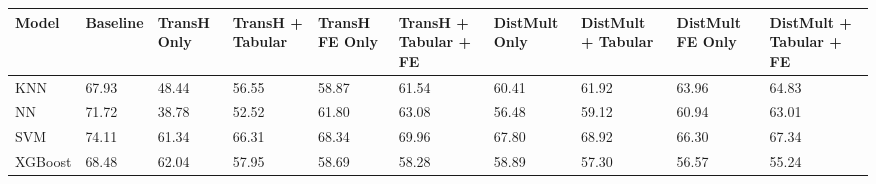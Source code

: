 \begin{tabular}{llllllllll}
\toprule
Model & Baseline & TransH Only & TransH + Tabular & TransH FE Only & TransH + Tabular + FE & DistMult Only & DistMult + Tabular & DistMult FE Only & DistMult + Tabular + FE \\
\midrule
KNN & 67.93 & 48.44 & 56.55 & 58.87 & 61.54 & 60.41 & 61.92 & 63.96 & 64.83 \\
NN & 71.72 & 38.78 & 52.52 & 61.80 & 63.08 & 56.48 & 59.12 & 60.94 & 63.01 \\
SVM & 74.11 & 61.34 & 66.31 & 68.34 & 69.96 & 67.80 & 68.92 & 66.30 & 67.34 \\
XGBoost & 68.48 & 62.04 & 57.95 & 58.69 & 58.28 & 58.89 & 57.30 & 56.57 & 55.24 \\
\bottomrule
\end{tabular}
